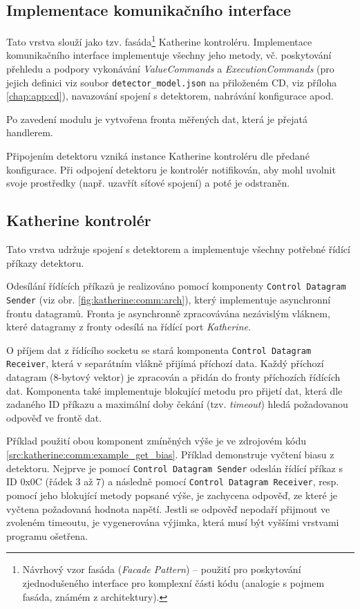 \subsection{Implementace komunikačního interface}
Tato vrstva slouží jako tzv. fasáda\footnote{Návrhový vzor fasáda (\textit{Facade Pattern}) -- použití pro poskytování zjednodušeného interface pro komplexní části kódu (analogie s pojmem fasáda, známém z architektury).} Katherine kontroléru. Implementace komunikačního interface implementuje všechny jeho metody, vč. poskytování přehledu a podpory vykonávání \textit{ValueCommands} a \textit{ExecutionCommands} (pro jejich definici viz soubor \texttt{detector\_model.json} na přiloženém CD, viz příloha \ref{chap:app:cd}), navazování spojení s detektorem, nahrávání konfigurace apod.

Po zavedení modulu je vytvořena fronta měřených dat, která je přejatá handlerem.

Připojením detektoru vzniká instance Katherine kontroléru dle předané konfigurace. Při odpojení detektoru je kontrolér notifikován, aby mohl uvolnit svoje prostředky (např. uzavřít síťové spojení) a poté je odstraněn.

\subsection{Katherine kontrolér}
Tato vrstva udržuje spojení s detektorem a implementuje všechny potřebné řídící příkazy detektoru.

Odesílání řídících příkazů je realizováno pomocí komponenty \texttt{Control Datagram Sender} (viz obr. \ref{fig:katherine:comm:arch}), který implementuje asynchronní frontu datagramů. Fronta je asynchronně zpracovávána nezávislým vláknem, které datagramy z fronty odesílá na řídící port \textit{Katherine}.

O příjem dat z řídícího socketu se stará komponenta \texttt{Control Datagram Receiver}, která v separátním vlákně přijímá příchozí data. Každý příchozí datagram (8-bytový vektor) je zpracován a přidán do fronty příchozích řídících dat. Komponenta také implementuje blokující metodu pro přijetí dat, která dle zadaného ID příkazu a maximální doby čekání (tzv. \textit{timeout}) hledá požadovanou odpověď ve frontě dat.

Příklad použití obou komponent zmíněných výše je ve zdrojovém kódu \ref{src:katherine:comm:example_get_bias}. Příklad demonstruje vyčtení biasu z detektoru. Nejprve je pomocí \texttt{Control Datagram Sender} odeslán řídící příkaz s ID 0x0C (řádek 3 až 7) a následně pomocí \texttt{Control Datagram Receiver}, resp. pomocí jeho blokující metody popsané výše, je zachycena odpověď, ze které je vyčtena požadovaná hodnota napětí. Jestli se odpověď nepodaří přijmout ve zvoleném timeoutu, je vygenerována výjimka, která musí být vyššími vrstvami programu ošetřena.

